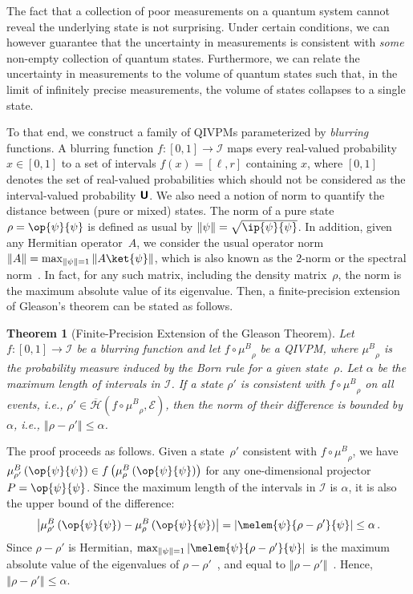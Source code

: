 \documentclass[english,reprint, aps, prl,superscriptaddress, showpacs,
showkeys, longbibliography, amsmath, amssymb, floatfix]{revtex4-1}
\theoremstyle{plain}
\newtheorem{thm}{Theorem}
\theoremstyle{definition}
\newcommand{\Hilb}{\mathcal{H}}
\newcommand{\events}{\ensuremath{\mathcal{E}}}
\newcommand{\unknown}{\textbf{\textsf{U}}}
\newcommand{\proj}[1]{\op{#1}{#1}}
\newcommand{\coreBorn}{\ensuremath{\overline{\Hilb}}}
\newcommand{\muB}{\ensuremath{\mu^{B}}}
\begin{document}
The fact that a collection of poor measurements on a quantum system
cannot reveal the underlying state is not surprising. Under certain
conditions, we can however guarantee that the uncertainty in measurements
is consistent with \emph{some} non-empty collection of quantum states.
Furthermore, we can relate the uncertainty in measurements to the
volume of quantum states such that, in the limit of infinitely precise
measurements, the volume of states collapses to a single state.

To that end, we construct a family of QIVPMs parameterized by \emph{blurring}
functions. A blurring function $f:\left[0,1\right]\rightarrow\mathscr{I}$
maps every real-valued probability $x\in\left[0,1\right]$ to a set
of intervals $f\left(x\right)=\left[\ell,r\right]$ containing $x$,
where $\left[0,1\right]$ denotes the set of real-valued probabilities
which should not be considered as the interval-valued probability
$\unknown$. We also need a notion of norm to quantify the
distance between (pure or mixed) states. The norm of a pure state
$\rho=\proj{\psi}$ is defined as usual by $\left\Vert \psi\right\Vert =\sqrt{\ip{\psi}{\psi}}$.
In addition, given any Hermitian operator~$A$, we consider the usual
operator norm $\left\Vert A\right\Vert =\max_{\left\Vert \psi\right\Vert =1}\left\Vert A\ket{\psi}\right\Vert $,
which is also known as the $2$-norm or the spectral norm~\cite{RobertsVarberg1973,peres1995quantum,GolubVanLoan1996,Foucart2012}.
In fact, for any such matrix, including the density matrix~$\rho$,
the norm is the maximum absolute value of its eigenvalue. Then, a
finite-precision extension of Gleason's theorem can be stated as follows.

\begin{thm}[Finite-Precision Extension of the Gleason Theorem]\label{thm:Finite-precision-Gleason}Let
$f:\left[0,1\right]\rightarrow\mathscr{I}$ be a blurring function
and let $f\circ\muB_{\rho}$ be a QIVPM, where $\muB_{\rho}$ is the
probability measure induced by the Born rule for a given state~$\rho$.
Let $\alpha$ be the maximum length of intervals in $\mathscr{I}$.
If a state $\rho'$ is consistent with $f\circ\muB_{\rho}$ on all
events, i.e., $\rho'\in\coreBorn\left(f\circ\muB_{\rho},\events\right)$,
then the norm of their difference is bounded by $\alpha$, i.e., $\left\Vert \rho-\rho'\right\Vert \le\alpha$.\end{thm}

The proof proceeds as follows. Given a state~$\rho'$ consistent
with $f\circ\muB_{\rho}$, we have $\muB_{\rho'}\left(\proj{\psi}\right)\in f\left(\muB_{\rho}\left(\proj{\psi}\right)\right)$
for any one-dimensional projector $P=\proj{\psi}$. Since the maximum
length of the intervals in $\mathscr{I}$ is $\alpha$, it is also
the upper bound of the difference: 
\[
\left|\muB_{\rho'}\left(\proj{\psi}\right)-\muB_{\rho}\left(\proj{\psi}\right)\right|=\left|\melem{\psi}{\rho-\rho'}{\psi}\right|\le\alpha\,.
\]
Since $\rho-\rho'$ is Hermitian, $\max_{\left\Vert \psi\right\Vert =1}\left|\melem{\psi}{\rho-\rho'}{\psi}\right|$
is the maximum absolute value of the eigenvalues of $\rho-\rho'$~\cite{544199},
and equal to $\left\Vert \rho-\rho'\right\Vert $~\cite{GolubVanLoan1996,Foucart2012}.
Hence, $\left\Vert \rho-\rho'\right\Vert \le\alpha$.
\end{document}
